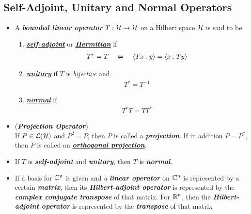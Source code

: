 \documentclass[11pt]{article}
\begin{document}
\subsection{Self-Adjoint, Unitary and Normal Operators}
\begin{itemize}
\item \begin{definition}
A \textbf{\emph{bounded linear operator}} $T: {\mathcal H} \rightarrow {\mathcal H}$ on a Hilbert space ${\mathcal H}$ is said to be
\begin{enumerate}
\item \underline{\emph{\textbf{self-adjoint}}} or \underline{\emph{\textbf{Hermitian}}} if
\begin{align*}
T^{*} = T \quad \Leftrightarrow \quad \left\langle Tx\,,\, y \right\rangle = \left\langle x\,,\, Ty \right\rangle
\end{align*}
\item \underline{\emph{\textbf{unitary}}} if $T$ is \emph{bijective} and
\begin{align*}
T^{*} = T^{-1} 
\end{align*}
\item \underline{\emph{\textbf{normal}}} if
\begin{align*}
T^{*}T = TT^{*}
\end{align*}
\end{enumerate}
\end{definition}

\item \begin{definition} (\emph{\textbf{Projection Operator}})\\
If $P \in {\mathcal L}({\mathcal H})$ and $P^2 = P$, then $P$ is called a \underline{\emph{\textbf{projection}}}. If in addition $P = P^*$, then $P$ is called an \underline{\emph{\textbf{orthogonal projection}}}. 
\end{definition}

\item \begin{remark}
If $T$ is \emph{\textbf{self-adjoint}} and \emph{\textbf{unitary}}, then $T$ is \emph{\textbf{normal}}.
\end{remark}

\item \begin{remark}
If a basis for ${\mathbb C}^n$ is given and \emph{a \textbf{linear operator}} on ${\mathbb C}^n$ is represented by a certain \emph{\textbf{matrix}}, then its \emph{\textbf{Hilbert-adjoint operator}} is represented by the \emph{\textbf{complex conjugate transpose}} of that matrix. For ${\mathbb R}^n$, then the  \emph{\textbf{Hilbert-adjoint operator}} is represented by the \emph{\textbf{transpose}} of that matrix
\end{remark}


\end{itemize}
\end{document}
